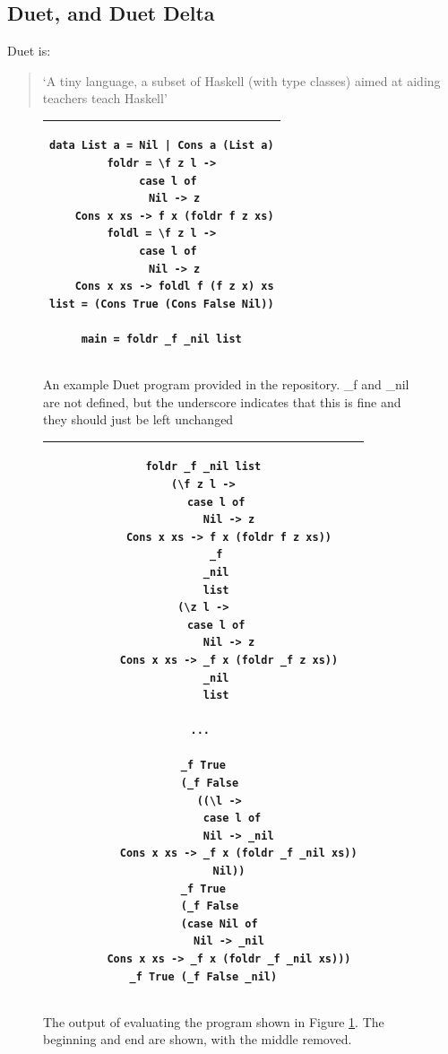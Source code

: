 \subsection{Duet, and Duet Delta}
\label{bg:duet}
Duet is:

\begin{quotation}
`A tiny language, a subset of Haskell (with type classes) aimed at aiding teachers teach Haskell' \cite{duet_hackage}
\end{quotation}

\begin{figure}[h]
    \centering
    \begin{tabular}{c}
    \hline
    \begin{lstlisting}[language=SFL_noprelude_numbers]
data List a = Nil | Cons a (List a)
foldr = \f z l ->
  case l of
    Nil -> z
    Cons x xs -> f x (foldr f z xs)
foldl = \f z l ->
  case l of
    Nil -> z
    Cons x xs -> foldl f (f z x) xs
list = (Cons True (Cons False Nil))

main = foldr _f _nil list
\end{lstlisting}\\ \hline

    \end{tabular}
    \caption{An example Duet program provided in the repository. \_f and \_nil are not defined, but the underscore indicates that this is fine and they should just be left unchanged}
    \label{bg:duet_foldr}
\end{figure}

\begin{figure}[h]
    \centering
    \begin{tabular}{c}
    \hline
    \begin{lstlisting}[language=SFL_noprelude_numbers]
foldr _f _nil list
(\f z l ->
    case l of
        Nil -> z
        Cons x xs -> f x (foldr f z xs))
    _f
    _nil
    list
(\z l ->
    case l of
        Nil -> z
        Cons x xs -> _f x (foldr _f z xs))
    _nil
    list

... 

_f True
  (_f False
     ((\l ->
         case l of
           Nil -> _nil
           Cons x xs -> _f x (foldr _f _nil xs))
        Nil))
_f True
  (_f False
     (case Nil of
        Nil -> _nil
        Cons x xs -> _f x (foldr _f _nil xs)))
_f True (_f False _nil)
\end{lstlisting}\\ \hline

    \end{tabular}
    \caption{The output of evaluating the program shown in Figure \ref{bg:duet_foldr}. The beginning and end are shown, with the middle removed. }
    \label{bg:duet_foldr_eval}
\end{figure}

